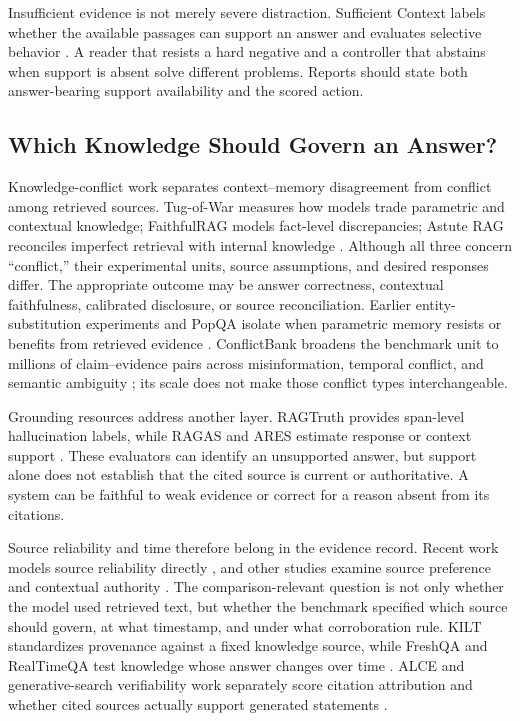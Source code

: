 Insufficient evidence is not merely severe distraction. Sufficient Context
labels whether the available passages can support an answer and evaluates
selective behavior \citep{sufficientContext2024}. A reader that resists a hard
negative and a controller that abstains when support is absent solve different
problems. Reports should state both answer-bearing support availability and
the scored action.

\subsection{Which Knowledge Should Govern an Answer?}

Knowledge-conflict work separates context--memory disagreement from conflict
among retrieved sources. Tug-of-War measures how models trade parametric and
contextual knowledge; FaithfulRAG models fact-level discrepancies; Astute RAG
reconciles imperfect retrieval with internal knowledge
\citep{tugOfWar2024,faithfulRAG2025,astuteRAG2025}. Although all three concern
``conflict,'' their experimental units, source assumptions, and desired
responses differ. The appropriate outcome may be answer correctness,
contextual faithfulness, calibrated disclosure, or source reconciliation.
Earlier entity-substitution experiments and PopQA isolate when parametric
memory resists or benefits from retrieved evidence
\citep{longpre2021conflicts,mallen2023trust}. ConflictBank broadens the
benchmark unit to millions of claim--evidence pairs across misinformation,
temporal conflict, and semantic ambiguity \citep{conflictBank2024}; its scale
does not make those conflict types interchangeable.

Grounding resources address another layer. RAGTruth provides span-level
hallucination labels, while RAGAS and ARES estimate response or context support
\citep{ragTruth2024,ragas2024,ares2024}. These evaluators can identify an
unsupported answer, but support alone does not establish that the cited source
is current or authoritative. A system can be faithful to weak evidence or
correct for a reason absent from its citations.

Source reliability and time therefore belong in the evidence record. Recent
work models source reliability directly \citep{sourceReliabilityRAG2025}, and
other studies examine source preference and contextual authority
\citep{rrag132,rrag147}. The comparison-relevant question is not only whether
the model used retrieved text, but whether the benchmark specified which
source should govern, at what timestamp, and under what corroboration rule.
KILT standardizes provenance against a fixed knowledge source, while FreshQA
and RealTimeQA test knowledge whose answer changes over time
\citep{kilt2021,freshllms2024,realtimeQA2023}. ALCE and generative-search
verifiability work separately score citation attribution and whether cited
sources actually support generated statements
\citep{alce2023,verifiability2023}.

